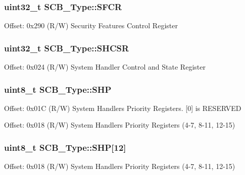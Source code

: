 \subsubsection[{\texorpdfstring{S\+F\+CR}{SFCR}}]{ uint32\+\_\+t S\+C\+B\+\_\+\+Type\+::\+S\+F\+CR}\hypertarget{structSCB__Type_a00ae0f2f224605dc8980a19d7624e533}{}\label{structSCB__Type_a00ae0f2f224605dc8980a19d7624e533}
Offset\+: 0x290 (R/W) Security Features Control Register 
\subsubsection[{\texorpdfstring{S\+H\+C\+SR}{SHCSR}}]{ uint32\+\_\+t S\+C\+B\+\_\+\+Type\+::\+S\+H\+C\+SR}\hypertarget{structSCB__Type_ae9891a59abbe51b0b2067ca507ca212f}{}\label{structSCB__Type_ae9891a59abbe51b0b2067ca507ca212f}
Offset\+: 0x024 (R/W) System Handler Control and State Register 
\subsubsection[{\texorpdfstring{S\+HP}{SHP}}]{ uint8\+\_\+t S\+C\+B\+\_\+\+Type\+::\+S\+HP}\hypertarget{structSCB__Type_a16d5a38234fb96ac6a5c4b2a9e78c1be}{}\label{structSCB__Type_a16d5a38234fb96ac6a5c4b2a9e78c1be}
Offset\+: 0x01C (R/W) System Handlers Priority Registers. \mbox{[}0\mbox{]} is R\+E\+S\+E\+R\+V\+ED

Offset\+: 0x018 (R/W) System Handlers Priority Registers (4-\/7, 8-\/11, 12-\/15) 
\subsubsection[{\texorpdfstring{S\+HP}{SHP}}]{ uint8\+\_\+t S\+C\+B\+\_\+\+Type\+::\+S\+HP\mbox{[}12\mbox{]}}\hypertarget{structSCB__Type_af6336103f8be0cab29de51daed5a65f4}{}\label{structSCB__Type_af6336103f8be0cab29de51daed5a65f4}
Offset\+: 0x018 (R/W) System Handlers Priority Registers (4-\/7, 8-\/11, 12-\/15) 
